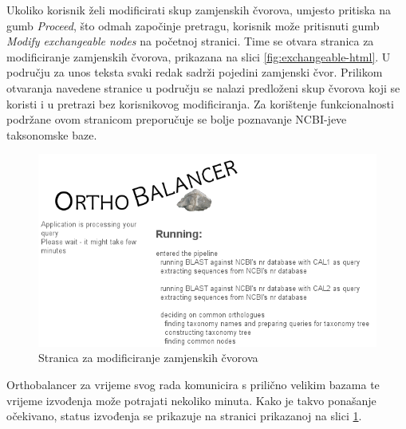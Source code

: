 Ukoliko korisnik želi modificirati skup zamjenskih čvorova, umjesto pritiska na
gumb \emph{Proceed}, što odmah započinje pretragu, korisnik može pritisnuti gumb
\emph{Modify exchangeable nodes} na početnoj stranici. Time se otvara stranica
za modificiranje zamjenskih čvorova, prikazana na slici
\ref{fig:exchangeable-html}. U području za unos teksta svaki redak sadrži
pojedini zamjenski čvor. Prilikom otvaranja navedene stranice u području se
nalazi predloženi skup čvorova koji se koristi i u pretrazi bez korisnikovog
modificiranja. Za korištenje funkcionalnosti podržane ovom stranicom preporučuje
se bolje poznavanje NCBI-jeve taksonomske baze.

\begin{figure}[h!]
\centering
\includegraphics[width=5.0in]{figures/executing-html.png}
\caption{Stranica za modificiranje zamjenskih čvorova}
\label{fig:executing-html}
\end{figure} 

Orthobalancer za vrijeme svog rada komunicira s prilično velikim bazama te
vrijeme izvođenja može potrajati nekoliko minuta. Kako je takvo ponašanje
očekivano, status izvođenja se prikazuje na stranici prikazanoj na slici
\ref{fig:executing-html}.
 
